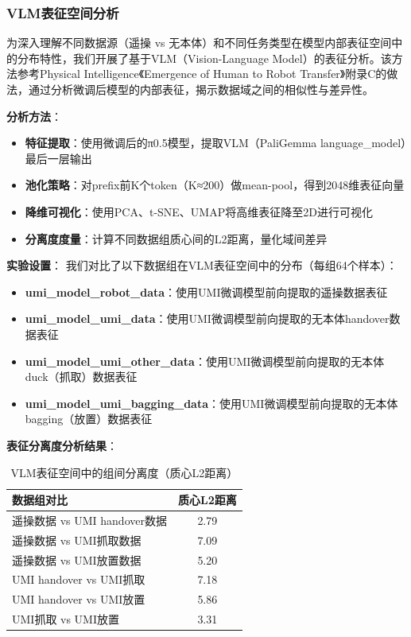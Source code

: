 \subsubsection{VLM表征空间分析}

为深入理解不同数据源（遥操 vs 无本体）和不同任务类型在模型内部表征空间中的分布特性，我们开展了基于VLM（Vision-Language Model）的表征分析。该方法参考Physical Intelligence《Emergence of Human to Robot Transfer》附录C的做法，通过分析微调后模型的内部表征，揭示数据域之间的相似性与差异性。

\textbf{分析方法}：
\begin{itemize}[leftmargin=2em]
    \item \textbf{特征提取}：使用微调后的π0.5模型，提取VLM（PaliGemma language\_model）最后一层输出
    \item \textbf{池化策略}：对prefix前K个token（K≈200）做mean-pool，得到2048维表征向量
    \item \textbf{降维可视化}：使用PCA、t-SNE、UMAP将高维表征降至2D进行可视化
    \item \textbf{分离度度量}：计算不同数据组质心间的L2距离，量化域间差异
\end{itemize}

\textbf{实验设置}：
我们对比了以下数据组在VLM表征空间中的分布（每组64个样本）：
\begin{itemize}[leftmargin=2em]
    \item \textbf{umi\_model\_robot\_data}：使用UMI微调模型前向提取的遥操数据表征
    \item \textbf{umi\_model\_umi\_data}：使用UMI微调模型前向提取的无本体handover数据表征
    \item \textbf{umi\_model\_umi\_other\_data}：使用UMI微调模型前向提取的无本体duck（抓取）数据表征
    \item \textbf{umi\_model\_umi\_bagging\_data}：使用UMI微调模型前向提取的无本体bagging（放置）数据表征
\end{itemize}

\textbf{表征分离度分析结果}：

\begin{table}[htbp]
\centering
\caption{VLM表征空间中的组间分离度（质心L2距离）}
\label{tab:vlm_separation}
\begin{tabular}{lc}
\toprule
数据组对比 & 质心L2距离 \\
\midrule
遥操数据 vs UMI handover数据 & 2.79 \\
遥操数据 vs UMI抓取数据 & 7.09 \\
遥操数据 vs UMI放置数据 & 5.20 \\
UMI handover vs UMI抓取 & 7.18 \\
UMI handover vs UMI放置 & 5.86 \\
UMI抓取 vs UMI放置 & 3.31 \\
\bottomrule
\end{tabular}
\end{table}

